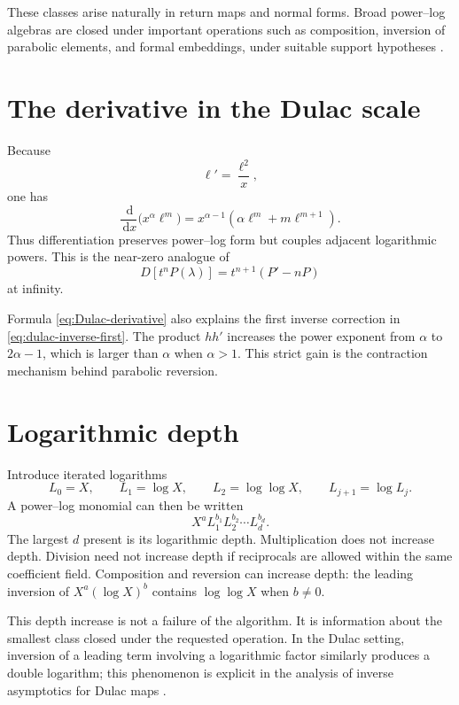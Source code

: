 \documentclass[11pt,openany]{book}
\theoremstyle{definition}
\theoremstyle{plain}
\theoremstyle{remark}
\newcommand{\dd}{\,\mathrm{d}}
\begin{document}
These classes arise naturally in return maps and normal forms. Broad power--log algebras are closed under important operations such as composition, inversion of parabolic elements, and formal embeddings, under suitable support hypotheses \cite{mardesic-normalforms,mardesic-length,resman-dulac,peran-logtransseries}.

\section{The derivative in the Dulac scale}
Because
\[
 \ell'=\frac{\ell^2}{x},
\]
one has
\begin{equation}\label{eq:Dulac-derivative}
 \frac{\dd}{\dd x}\bigl(x^\alpha\ell^m\bigr)
 =x^{\alpha-1}\left(\alpha\ell^m+m\ell^{m+1}\right).
\end{equation}
Thus differentiation preserves power--log form but couples adjacent logarithmic powers. This is the near-zero analogue of
\[
 D[t^nP(\lambda)]=t^{n+1}(P'-nP)
\]
at infinity.

Formula \cref{eq:Dulac-derivative} also explains the first inverse correction in \cref{eq:dulac-inverse-first}. The product \(hh'\) increases the power exponent from \(\alpha\) to \(2\alpha-1\), which is larger than \(\alpha\) when \(\alpha>1\). This strict gain is the contraction mechanism behind parabolic reversion.

\section{Logarithmic depth}
Introduce iterated logarithms
\[
 L_0=X,
 \qquad L_1=\log X,
 \qquad L_2=\log\log X,
 \qquad L_{j+1}=\log L_j.
\]
A power--log monomial can then be written
\begin{equation}\label{eq:iterated-log-monomial}
 X^aL_1^{b_1}L_2^{b_2}\cdots L_d^{b_d}.
\end{equation}
The largest \(d\) present is its logarithmic depth. Multiplication does not increase depth. Division need not increase depth if reciprocals are allowed within the same coefficient field. Composition and reversion can increase depth: the leading inversion of \(X^a(\log X)^b\) contains \(\log\log X\) when \(b\ne0\).

This depth increase is not a failure of the algorithm. It is information about the smallest class closed under the requested operation. In the Dulac setting, inversion of a leading term involving a logarithmic factor similarly produces a double logarithm; this phenomenon is explicit in the analysis of inverse asymptotics for Dulac maps \cite{mardesic-length}.
\end{document}
